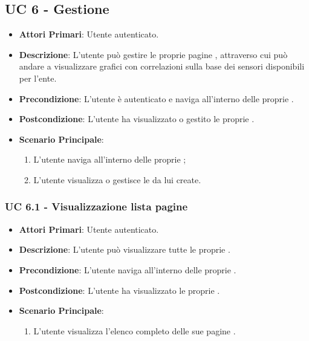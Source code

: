 	\subsection{UC 6 - Gestione }
		\begin{itemize}
			\item \textbf{Attori Primari}: Utente autenticato.
			\item \textbf{Descrizione}: L'utente può gestire le proprie pagine , attraverso cui può andare a visualizzare grafici con correlazioni sulla base dei sensori disponibili per l'ente.
			\item \textbf{Precondizione}: L'utente è autenticato e naviga all'interno delle proprie .
			\item \textbf{Postcondizione}: L'utente ha visualizzato o gestito le proprie .
			\item \textbf{Scenario Principale}:
			\begin{enumerate}
				\item{L'utente naviga all'interno delle proprie ;}
				\item{L'utente visualizza o gestisce le  da lui create.}
			\end{enumerate}	
		\end{itemize}

			\subsubsection{UC 6.1 - Visualizzazione lista pagine }
			\begin{itemize}
				\item \textbf{Attori Primari}: Utente autenticato.
				\item \textbf{Descrizione}: L'utente può visualizzare tutte le proprie .
				\item \textbf{Precondizione}: L'utente naviga all'interno delle proprie .
				\item \textbf{Postcondizione}: L'utente ha visualizzato le proprie .
				\item \textbf{Scenario Principale}:
				\begin{enumerate}
					\item{L'utente visualizza l'elenco completo delle sue pagine .}
				\end{enumerate}	
			\end{itemize}

